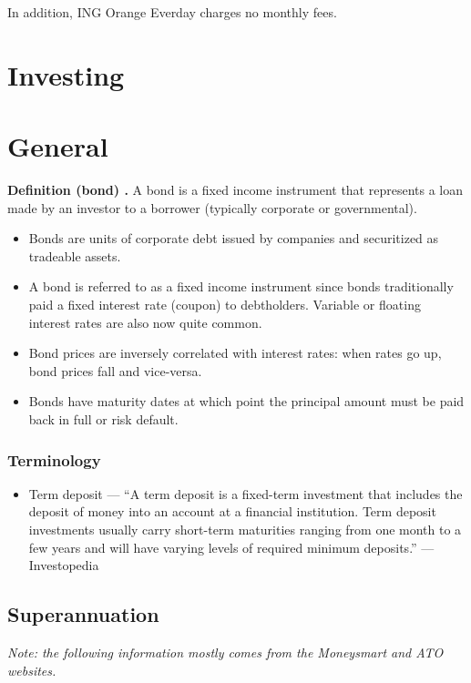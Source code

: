 In addition, ING Orange Everday charges no monthly fees.

\section{Investing}

\section{General}
\begin{shade}
\textbf{Definition (bond) \cite{investopedia_bond}.} A bond is a fixed income instrument that represents a loan made by an investor to a borrower (typically corporate or governmental).
\begin{itemize}
	\item Bonds are units of corporate debt issued by companies and securitized as tradeable assets.
	\item A bond is referred to as a fixed income instrument since bonds traditionally paid a fixed interest rate (coupon) to debtholders. Variable or floating interest rates are also now quite common.
	\item Bond prices are inversely correlated with interest rates: when rates go up, bond prices fall and vice-versa.
	\item Bonds have maturity dates at which point the principal amount must be paid back in full or risk default.
\end{itemize}
\end{shade}

\subsubsection{Terminology}
\begin{itemize}
	\item Term deposit --- ``A term deposit is a fixed-term investment that includes the deposit of money into an account at a financial institution. Term deposit investments usually carry short-term maturities ranging from one month to a few years and will have varying levels of required minimum deposits.'' --- Investopedia \cite{investopedia_term_deposit}
\end{itemize}

\subsection{Superannuation}

\textit{Note: the following information mostly comes from the Moneysmart \cite{moneysmart_super} and ATO \cite{ato_super} websites.}

